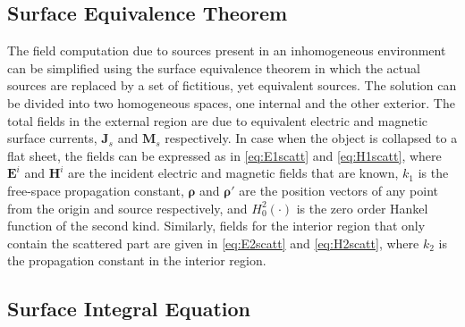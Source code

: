 \documentclass{ieeeaccess}
\renewcommand{\v}[1]{\mathbf{#1}} %
\newcommand{\p}{\rho}  %
\newcommand{\vp}{\boldsymbol \p}  %
\renewcommand{\^}{\hat}  %
\begin{document}
\subsection{Surface Equivalence Theorem}
%
The field computation due to sources present in an inhomogeneous environment can be simplified using the surface equivalence theorem in which the actual sources are replaced by a set of fictitious, yet equivalent sources. The solution can be divided into two homogeneous spaces, one internal and the other exterior. The total fields in the external region are due to equivalent electric and magnetic surface currents, $\v J_s$ and $\v M_s$ respectively.  In case when the object is collapsed to a flat sheet, the fields can be expressed as in \eqref{eq:E1scatt} and \eqref{eq:H1scatt}, where $\v E^i$ and $\v H^i$ are the incident electric and magnetic fields that are known, $k_1$ is the free-space propagation constant, $\vp$ and $\vp'$ are the position vectors of any point from the origin and source respectively, and $H_0^2(\cdot)$ is the zero order Hankel function of the second kind.  Similarly, fields for the interior region that only contain the scattered part are given in \eqref{eq:E2scatt} and \eqref{eq:H2scatt}, where $k_2$ is the propagation constant in the interior region.
%

\subsection{Surface Integral Equation}
%
\end{document}
